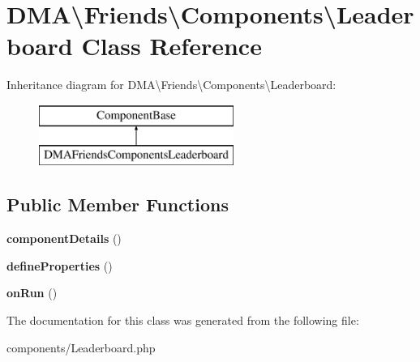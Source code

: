 \hypertarget{classDMA_1_1Friends_1_1Components_1_1Leaderboard}{}\section{D\+M\+A\textbackslash{}Friends\textbackslash{}Components\textbackslash{}Leaderboard Class Reference}
\label{classDMA_1_1Friends_1_1Components_1_1Leaderboard}
Inheritance diagram for D\+M\+A\textbackslash{}Friends\textbackslash{}Components\textbackslash{}Leaderboard\+:\begin{figure}[H]
\begin{center}
\leavevmode
\includegraphics[height=2.000000cm]{d0/dc3/classDMA_1_1Friends_1_1Components_1_1Leaderboard}
\end{center}
\end{figure}
\subsection*{Public Member Functions}
\begin{DoxyCompactItemize}
\item 
\hypertarget{classDMA_1_1Friends_1_1Components_1_1Leaderboard_ac298bbc8342d5ca037f56917576540e2}{}{\bfseries component\+Details} ()\label{classDMA_1_1Friends_1_1Components_1_1Leaderboard_ac298bbc8342d5ca037f56917576540e2}

\item 
\hypertarget{classDMA_1_1Friends_1_1Components_1_1Leaderboard_a7843bfe0d9730a159c23a9c1b41def56}{}{\bfseries define\+Properties} ()\label{classDMA_1_1Friends_1_1Components_1_1Leaderboard_a7843bfe0d9730a159c23a9c1b41def56}

\item 
\hypertarget{classDMA_1_1Friends_1_1Components_1_1Leaderboard_a6bdcc8d37f99c4363d7b79e83c793160}{}{\bfseries on\+Run} ()\label{classDMA_1_1Friends_1_1Components_1_1Leaderboard_a6bdcc8d37f99c4363d7b79e83c793160}

\end{DoxyCompactItemize}


The documentation for this class was generated from the following file\+:\begin{DoxyCompactItemize}
\item 
components/Leaderboard.\+php\end{DoxyCompactItemize}
